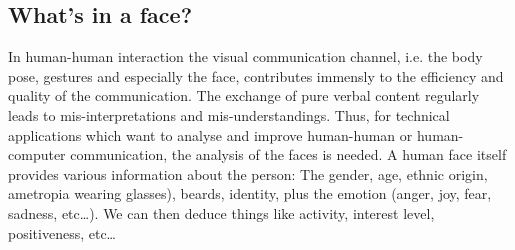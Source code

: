 \IEEEPARstart{}{}
\subsection{What's in a face?}
 In human-human interaction the visual communication channel, i.e. the body pose, gestures and especially the face, contributes immensly to the efficiency and quality of the communication. The exchange of pure verbal content  regularly leads to mis-interpretations and mis-understandings. Thus, for technical applications which want to analyse and improve human-human or human-computer communication, the analysis of the faces is needed. A human face itself provides various information about the person: The gender, age, ethnic origin, ametropia wearing glasses), beards, identity, plus the emotion (anger, joy, fear, sadness, etc\dots ). We can then deduce things like activity, interest level, positiveness, etc\dots
